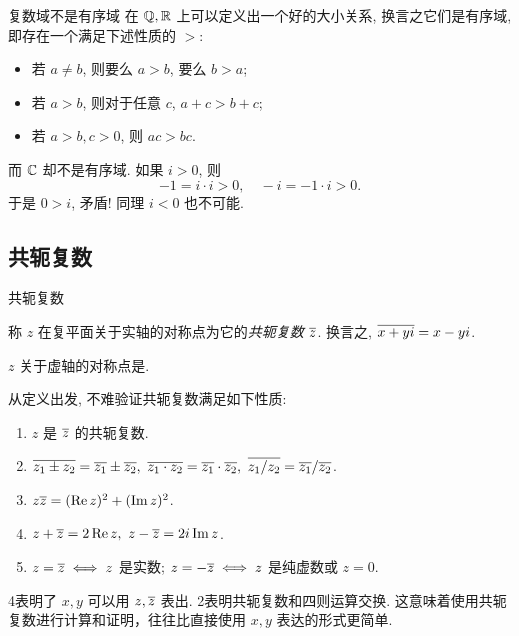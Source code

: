 \begin{frame}{复数域不是有序域\noexer}
	\onslide<+->
	在 ${\mathbb{Q}},{\mathbb{R}}$ 上可以定义出一个好的大小关系,
	\onslide<+->
	换言之它们是有序域, 即存在一个满足下述性质的 $>$:
	\begin{itemize}
		\item 若 $a\neq b$, 则要么 $a>b$, 要么 $b>a$;
		\item 若 $a>b$, 则对于任意 $c$, $a+c>b+c$;
		\item 若 $a>b,c>0$, 则 $ac>bc$.
	\end{itemize}
	\onslide<+->
	而 \alert{${\mathbb{C}}$ 却不是有序域}.
	\onslide<+->
	如果 $i>0$, 则
		\[-1=i\cdot i>0,\quad -i=-1\cdot i>0.\]
	\onslide<+->
	于是 $0>i$, 矛盾! 同理 $i<0$ 也不可能.
\end{frame}


\subsection{共轭复数}

\begin{frame}{共轭复数}
	\onslide<+->
	\begin{definition}
		称 $z$ 在复平面关于实轴的对称点为它的\emph{共轭复数 $\overline z$}.
	换言之, $\overline{x+yi}=x-yi$.
	\end{definition}
	\onslide<+->
	\begin{exercise}
		$z$ 关于虚轴的对称点是.
	\end{exercise}
	\onslide<+->
	从定义出发, 不难验证共轭复数满足如下性质:
	\begin{enumerate}
		\item $z$ 是 $\overline z$ 的共轭复数.
		\item $\ov{z_1\pm z_2}=\ov{z_1}\pm\ov{z_2},\ 
		\ov{z_1\cdot z_2}=\ov{z_1}\cdot\ov{z_2},\ 
		\ov{z_1/z_2}=\ov{z_1}/\ov{z_2}$.
		\item $z\overline{z}=(\operatorname{Re} z)^2+(\operatorname{Im} z)^2$.
		\item $z+\overline z=2\operatorname{Re} z,\ z-\overline z=2i\operatorname{Im} z$.
		\item $z=\overline z\iff z$ 是实数; $z=-\overline z\iff z$ 是纯虚数或 $z=0$.
	\end{enumerate}
	\onslide<+->
	\enumnum4表明了 $x,y$ 可以用 $z,\overline z$ 表出.
	\onslide<+->
	\enumnum2表明共轭复数和四则运算交换.
	\onslide<+->
	这意味着使用共轭复数进行计算和证明，往往比直接使用 $x,y$ 表达的形式更简单.
\end{frame}


